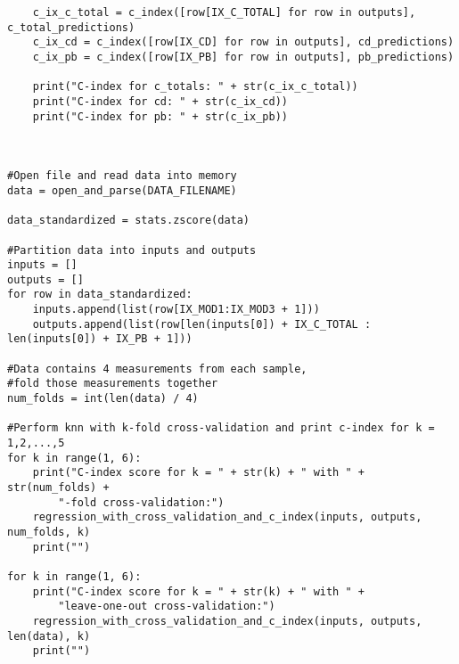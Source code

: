 \documentclass[a4paper]{article}
\begin{document}
\begin{lstlisting}
    c_ix_c_total = c_index([row[IX_C_TOTAL] for row in outputs], c_total_predictions)
    c_ix_cd = c_index([row[IX_CD] for row in outputs], cd_predictions)
    c_ix_pb = c_index([row[IX_PB] for row in outputs], pb_predictions)

    print("C-index for c_totals: " + str(c_ix_c_total))
    print("C-index for cd: " + str(c_ix_cd))
    print("C-index for pb: " + str(c_ix_pb))



#Open file and read data into memory
data = open_and_parse(DATA_FILENAME)

data_standardized = stats.zscore(data)

#Partition data into inputs and outputs
inputs = []
outputs = []
for row in data_standardized:
    inputs.append(list(row[IX_MOD1:IX_MOD3 + 1]))
    outputs.append(list(row[len(inputs[0]) + IX_C_TOTAL : len(inputs[0]) + IX_PB + 1]))

#Data contains 4 measurements from each sample, 
#fold those measurements together
num_folds = int(len(data) / 4)

#Perform knn with k-fold cross-validation and print c-index for k = 1,2,...,5
for k in range(1, 6):
    print("C-index score for k = " + str(k) + " with " + str(num_folds) + 
        "-fold cross-validation:")
    regression_with_cross_validation_and_c_index(inputs, outputs, num_folds, k)
    print("")

for k in range(1, 6):
    print("C-index score for k = " + str(k) + " with " + 
        "leave-one-out cross-validation:")
    regression_with_cross_validation_and_c_index(inputs, outputs, len(data), k)
    print("")

\end{lstlisting}
\end{document}
